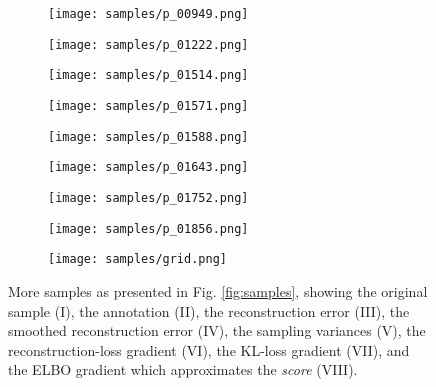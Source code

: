 \documentclass{article}
\begin{document}
\begin{figure}[ht!]
  \begin{subfigure}[b]{0.95\textwidth}
      \centering
      \texttt{[image: samples/p\_00949.png]}
  \end{subfigure}
  \begin{subfigure}[b]{0.95\textwidth}
      \centering
      \texttt{[image: samples/p\_01222.png]}
  \end{subfigure}
  \begin{subfigure}[b]{0.95\textwidth}
      \centering
      \texttt{[image: samples/p\_01514.png]}
  \end{subfigure}
  \begin{subfigure}[b]{0.95\textwidth}
      \centering
      \texttt{[image: samples/p\_01571.png]}
  \end{subfigure}
  \begin{subfigure}[b]{0.95\textwidth}
      \centering
      \texttt{[image: samples/p\_01588.png]}
  \end{subfigure}
  \begin{subfigure}[b]{0.95\textwidth}
      \centering
      \texttt{[image: samples/p\_01643.png]}
  \end{subfigure}
  \begin{subfigure}[b]{0.95\textwidth}
      \centering
      \texttt{[image: samples/p\_01752.png]}
  \end{subfigure}
  \begin{subfigure}[b]{0.95\textwidth}
      \centering
      \texttt{[image: samples/p\_01856.png]}
  \end{subfigure}
  \begin{subfigure}[b]{0.95\textwidth}
      \centering
      \texttt{[image: samples/grid.png]}
  \end{subfigure}


\caption{More samples as presented in Fig. \ref{fig:samples}, showing the original sample (I), the annotation (II), the reconstruction error (III), the smoothed reconstruction error (IV), the sampling variances (V), the reconstruction-loss gradient  (VI), the KL-loss gradient (VII), and the ELBO gradient which approximates the \textit{score} (VIII).}
\label{fig:more2}
\end{figure}
\end{document}
